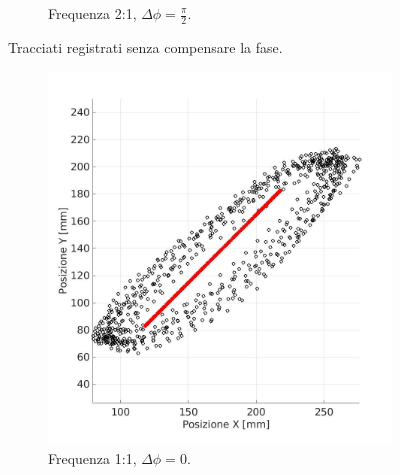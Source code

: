 \documentclass[12pt,twoside,openright]{report}
\begin{document}
\begin{figure}[h!]
\begin{subfigure}{0.49\textwidth}
    \caption{Frequenza 2:1, $\Delta \phi= \frac{\pi}{2}$.}
    \label{fig:i1}
\end{subfigure}     
\vspace*{10mm}
\caption{Tracciati registrati senza compensare la fase.}
\label{fig:lissajous2}
\end{figure}
\newpage
\begin{figure}[h!]
\centering
\begin{subfigure}{0.49\textwidth}
    \includegraphics[width=\textwidth]{rc.jpg}
    \caption{Frequenza 1:1, $\Delta \phi= 0$.}
    \label{fig:rc1}
    \vspace*{10mm}
\end{subfigure}
\hfill
\begin{subfigure}{0.49\textwidth}

\end{subfigure}
\end{figure}
\end{document}
